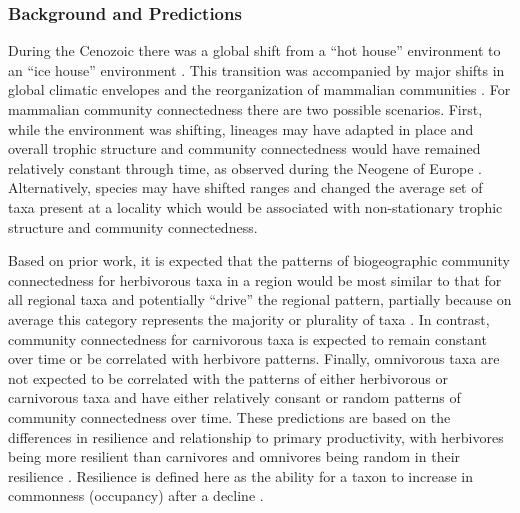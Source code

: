 \documentclass[12pt,letterpaper]{article}
\begin{document}
\subsubsection{Background and Predictions} \label{sec:mamcomback}
During the Cenozoic there was a global shift from a ``hot house'' environment to an ``ice house'' environment \citep{Zachos2008,Zachos2001}. This transition was accompanied by major shifts in global climatic envelopes and the reorganization of mammalian communities \citep{Janis1993a,Fortelius2002,Blois2009,Alroy2000g,Figueirido2012}. For mammalian community connectedness there are two possible scenarios. First, while the environment was shifting, lineages may have adapted in place and overall trophic structure and community connectedness would have remained relatively constant through time, as observed during the Neogene of Europe \citep{Jernvall2004}. Alternatively, species may have shifted ranges and changed the average set of taxa present at a locality which would be associated with non-stationary trophic structure and community connectedness.


Based on prior work, it is expected that the patterns of biogeographic community connectedness for herbivorous taxa in a region would be most similar to that for all regional taxa and potentially ``drive'' the regional pattern, partially because on average this category represents the majority or plurality of taxa \citep{Jernvall2002}. In contrast, community connectedness for carnivorous taxa is expected to remain constant over time or be correlated with herbivore patterns. Finally, omnivorous taxa are not expected to be correlated with the patterns of either herbivorous or carnivorous taxa and have either relatively consant or random patterns of community connectedness over time.  These predictions are based on the differences in resilience and relationship to primary productivity, with herbivores being more resilient than carnivores and omnivores being random in their resilience \citep{Jernvall2004}. Resilience is defined here as the ability for a taxon to increase in commonness (occupancy) after a decline \citep{Jernvall2004}.
\end{document}
